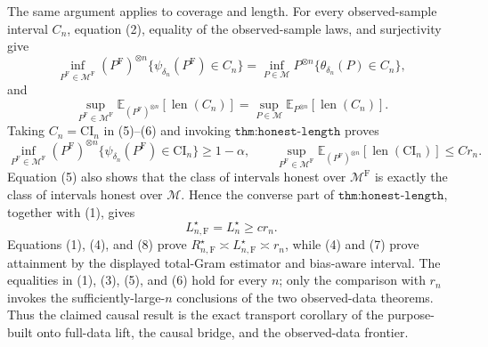 The same argument applies to coverage and length.  For every observed-sample interval \(C_n\), equation (2), equality of the observed-sample laws, and surjectivity give
\[
 \inf_{P^{\mathrm F}\in\mathcal M^{\mathrm F}}
 (P^{\mathrm F})^{\otimes n}
 \{\psi_{\delta_n}(P^{\mathrm F})\in C_n\}
 =
 \inf_{P\in\mathcal M}
 P^{\otimes n}\{\theta_{\delta_n}(P)\in C_n\}, \tag{5}
\]
and
\[
 \sup_{P^{\mathrm F}\in\mathcal M^{\mathrm F}}
 \mathbb E_{(P^{\mathrm F})^{\otimes n}}[\operatorname{len}(C_n)]
 =
 \sup_{P\in\mathcal M}
 \mathbb E_{P^{\otimes n}}[\operatorname{len}(C_n)]. \tag{6}
\]
Taking \(C_n=\mathrm{CI}_n\) in (5)--(6) and invoking \(\texttt{thm:honest-length}\) proves
\[
 \inf_{P^{\mathrm F}\in\mathcal M^{\mathrm F}}
 (P^{\mathrm F})^{\otimes n}
 \{\psi_{\delta_n}(P^{\mathrm F})\in\mathrm{CI}_n\}
 \geq1-\alpha,
 \qquad
 \sup_{P^{\mathrm F}\in\mathcal M^{\mathrm F}}
 \mathbb E_{(P^{\mathrm F})^{\otimes n}}
 [\operatorname{len}(\mathrm{CI}_n)]
 \leq C r_n. \tag{7}
\]
Equation (5) also shows that the class of intervals honest over \(\mathcal M^{\mathrm F}\) is exactly the class of intervals honest over \(\mathcal M\).  Hence the converse part of \(\texttt{thm:honest-length}\), together with (1), gives
\[
 L_{n,\mathrm F}^\star=L_n^\star\geq c r_n. \tag{8}
\]
Equations (1), (4), and (8) prove \(R_{n,\mathrm F}^\star\asymp L_{n,\mathrm F}^\star\asymp r_n\), while (4) and (7) prove attainment by the displayed total-Gram estimator and bias-aware interval.  The equalities in (1), (3), (5), and (6) hold for every \(n\); only the comparison with \(r_n\) invokes the sufficiently-large-\(n\) conclusions of the two observed-data theorems.  Thus the claimed causal result is the exact transport corollary of the purpose-built onto full-data lift, the causal bridge, and the observed-data frontier.
